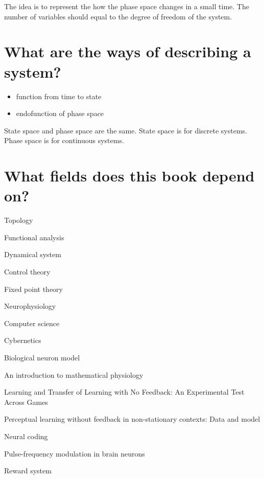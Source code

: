 The idea is to represent the how the phase space changes in a small time.
The number of variables should equal to the degree of freedom of the system.

\section{What are the ways of describing a system?}

\begin{itemize}
    \item function from time to state
    \item endofunction of phase space
\end{itemize}

State space and phase space are the same.
State space is for discrete systems.
Phase space is for continuous systems.

\section{What fields does this book depend on?}

Topology \cite{Topology}

Functional analysis

Dynamical system

Control theory

Fixed point theory

Neurophysiology

Computer science

Cybernetics


Biological neuron model

An introduction to mathematical physiology

Learning and Transfer of Learning with No Feedback: An Experimental Test Across Games

Perceptual learning without feedback in non-stationary contexts: Data and model

Neural coding

Pulse-frequency modulation in brain neurons

Reward system
